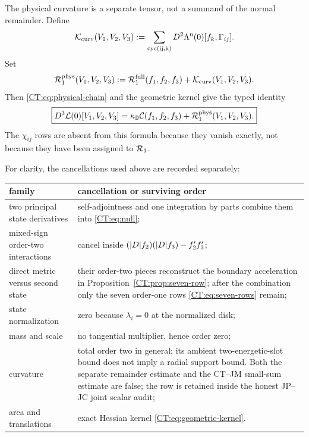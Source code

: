 The physical curvature is a separate tensor, not a summand of the normal
remainder.  Define
\begin{equation}\label{CT:eq:K-physical}
 \mathcal K_{\rm curv}(V_1,V_2,V_3)
 :=\sum_{\rm cyc(ij,k)}D^2\Lambda^{\rm n}(0)
     [f_k,\Gamma_{ij}].
\end{equation}
Set
\begin{equation}\label{CT:eq:Rphys}
 \mathcal R_1^{\rm phys}(V_1,V_2,V_3)
 :=\mathcal R_1^{\rm full}(f_1,f_2,f_3)
   +\mathcal K_{\rm curv}(V_1,V_2,V_3).
\end{equation}
Then \eqref{CT:eq:physical-chain} and the geometric kernel give the typed
identity
\begin{equation}\label{CT:eq:physical-complete-split}
 \boxed{
 D^3\mathcal L(0)[V_1,V_2,V_3]
 =\kappa_{\mathbb D}\mathcal C(f_1,f_2,f_3)
  +\mathcal R_1^{\rm phys}(V_1,V_2,V_3).}
\end{equation}
The $\chi_{ij}$ rows are absent from this formula because they vanish
exactly, not because they have been assigned to $\mathcal R_1$.

For clarity, the cancellations used above are recorded separately:
\begin{center}
\begin{tabular}{>{\raggedright\arraybackslash}p{.27\linewidth}
                >{\raggedright\arraybackslash}p{.61\linewidth}}
\toprule
family & cancellation or surviving order\\
\midrule
two principal state derivatives & self-adjointness and one integration by
parts combine them into \eqref{CT:eq:null};\\
mixed-sign order-two interactions & cancel inside
$(|D| f_2)(|D| f_3)-f_2'f_3'$;\\
direct metric versus second state & their order-two pieces reconstruct the
boundary acceleration in Proposition~\ref{CT:prop:seven-row}; after the
combination only the seven order-one rows \eqref{CT:eq:seven-rows} remain;\\
state normalization & zero because $\lambda_i=0$ at the normalized disk;\\
mass and scale & no tangential multiplier, hence order zero;\\
curvature & total order two in general; its ambient two-energetic-slot bound
does not imply a radial support bound.  Both the separate remainder estimate
and the CT--JM small-sum estimate are false; the row is retained inside the
honest JP--JC joint scalar audit;\\
area and translations & exact Hessian kernel
\eqref{CT:eq:geometric-kernel}.\\
\bottomrule
\end{tabular}
\end{center}

